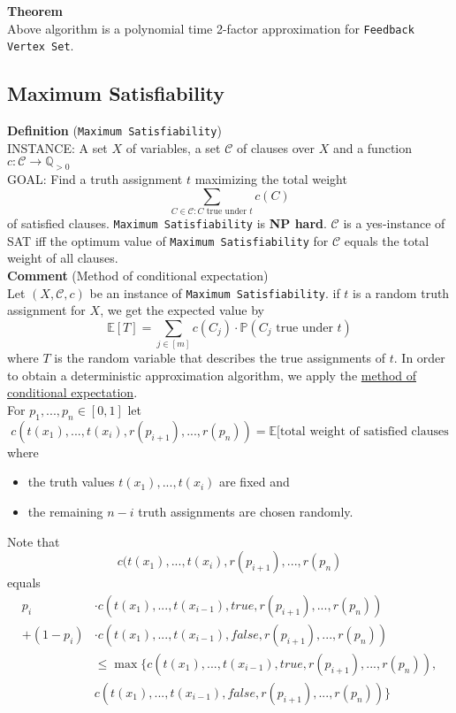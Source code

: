 \documentclass[a4paper, 12pt]{article}
\begin{document}
	\noindent\textbf{Theorem}\\
	Above algorithm is a polynomial time 2-factor approximation for \texttt{Feedback Vertex Set}.
	\subsection{Maximum Satisfiability}
	\textbf{Definition} (\texttt{Maximum Satisfiability})\\
	INSTANCE: A set $X$ of variables, a set $\mathcal{C}$ of clauses over $X$ and a function $c: \mathcal{C} \to \mathbb{Q}_{>0}$\\
	GOAL: Find a truth assignment $t$ maximizing the total weight  \[\sum_{C \in \mathcal{C}: C \text{ true under } t} c(C)\]
	of satisfied clauses. \texttt{Maximum Satisfiability} is \textbf{NP hard}. $\mathcal{C}$ is a yes-instance of SAT iff the optimum value of \texttt{Maximum Satisfiability} for $\mathcal{C}$ equals the total weight of all clauses.\\
	\textbf{Comment} (Method of conditional expectation)\\
	Let $(X,\mathcal{C},c)$ be an instance of \texttt{Maximum Satisfiability}. if $t$ is a random truth assignment for $X$, we get the expected value by \[\mathbb{E}[T] = \sum_{j \in [m]} c(C_j)\cdot \mathbb{P}(C_j \text{ true under } t)\]
	where $T$ is the random variable that describes the true assignments of $t$. In order to obtain a deterministic approximation algorithm, we apply the \underline{method of conditional expectation}.\\
	For $p_1,...,p_n \in [0,1]$ let \[c(t(x_1),...,t(x_i),r(p_{i+1}),...,r(p_n)) = \mathbb{E}[\text{total weight of satisfied clauses}\]
	where \begin{itemize}
		\item the truth values $t(x_1),...,t(x_i)$ are fixed and 
		\item the remaining $n-i$ truth assignments are chosen randomly. 
	\end{itemize}
	Note that \[c(t(x_1),...,t(x_i),r(p_{i+1}),...,r(p_n)\]
	equals \begin{align*}
		p_i &\cdot c(t(x_1),...,t(x_{i-1}), true,r(p_{i+1}),...,r(p_n))\\ + (1-p_i)&\cdot c(t(x_1),...,t(x_{i-1}),false,r(p_{i+1}),...,r(p_n))\\
		&\leq \max \{c(t(x_1),...,t(x_{i-1}), true,r(p_{i+1}),...,r(p_n)),\\ &c(t(x_1),...,t(x_{i-1}),false,r(p_{i+1}),...,r(p_n))\}
	\end{align*}
\end{document}

